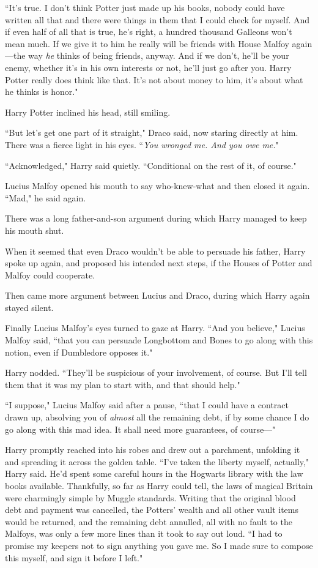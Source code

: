 ``It's true. I don't think Potter just made up his books, nobody could have written all that and there were things in them that I could check for myself. And if even half of all that is true, he's right, a hundred thousand Galleons won't mean much. If we give it to him he really will be friends with House Malfoy again—the way \emph{he} thinks of being friends, anyway. And if we don't, he'll be your enemy, whether it's in his own interests or not, he'll just go after you. Harry Potter really does think like that. It's not about money to him, it's about what he thinks is honor."

Harry Potter inclined his head, still smiling.

``But let's get one part of it straight," Draco said, now staring directly at him. There was a fierce light in his eyes. ``\emph{You wronged me. \emph{And} you owe me.}"

``Acknowledged," Harry said quietly. ``Conditional on the rest of it, of course."

Lucius Malfoy opened his mouth to say who-knew-what and then closed it again. ``Mad," he said again.

There was a long father-and-son argument during which Harry managed to keep his mouth shut.

When it seemed that even Draco wouldn't be able to persuade his father, Harry spoke up again, and proposed his intended next steps, if the Houses of Potter and Malfoy could cooperate.

Then came more argument between Lucius and Draco, during which Harry again stayed silent.

Finally Lucius Malfoy's eyes turned to gaze at Harry. ``And you believe," Lucius Malfoy said, ``that you can persuade Longbottom and Bones to go along with this notion, even if Dumbledore opposes it."

Harry nodded. ``They'll be suspicious of your involvement, of course. But I'll tell them that it was my plan to start with, and that should help."

``I suppose," Lucius Malfoy said after a pause, ``that I could have a contract drawn up, absolving you of \emph{almost} all the remaining debt, if by some chance I do go along with this mad idea. It shall need more guarantees, of course—"

Harry promptly reached into his robes and drew out a parchment, unfolding it and spreading it across the golden table. ``I've taken the liberty myself, actually," Harry said. He'd spent some careful hours in the Hogwarts library with the law books available. Thankfully, so far as Harry could tell, the laws of magical Britain were charmingly simple by Muggle standards. Writing that the original blood debt and payment was cancelled, the Potters' wealth and all other vault items would be returned, and the remaining debt annulled, all with no fault to the Malfoys, was only a few more lines than it took to say out loud. ``I had to promise my keepers not to sign anything you gave me. So I made sure to compose this myself, and sign it before I left."


